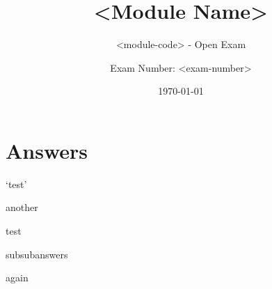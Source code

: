 \documentclass{UoYCSexam}
\title{<Module Name>}
\subtitle{ <module-code> - Open Exam }
\author{ Exam Number: <exam-number> }
\date{\today}
\begin{document}
\maketitle
\pagebreak


\acresetall
\section*{Answers}

\begin{answers}
  \item
  \begin{subanswers}
    \item \lipsum[1][1-7]
    \item \lipsum[1][1-3]
    \item {}
    \item `test'
    \item another
  \end{subanswers}
  \pagebreak
  \item
  \begin{subanswers}
    \item \lipsum[1][1-7]
    \item \lipsum[1][1-3]
    \item {}
    \item test
    \item \begin{subsubanswers}
            \item subsubanswers
            \item again
          \end{subsubanswers}
  \end{subanswers}
\end{answers}

\end{document}
